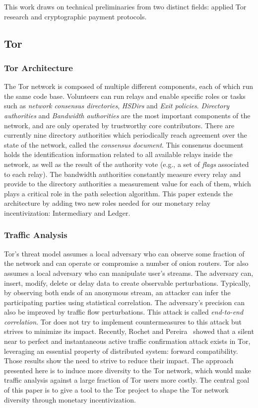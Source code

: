 This work draws on technical preliminaries from two distinct fields: applied
Tor research and cryptographic payment protocols.

\subsection{Tor}

\subsubsection{Tor Architecture}
The Tor network is composed of multiple different components, each of which run
the same code base. Volunteers can run relays and enable specific roles or tasks
such as \textit{network consensus directories}, \textit{HSDirs} and \textit{Exit
  policies}. \textit{Directory authorities} and \textit{Bandwidth authorities}
are the most important components of the network, and are only operated by
trustworthy core contributors. There are currently nine directory authorities
which periodically reach agreement over the state of the network, called the
\textit{consensus document}. This consensus document holds the identification
information related to all available relays inside the network, as well as the
result of the authority vote (e.g., a set of \textit{flags} associated to each
relay). The bandwidth authorities constantly measure every relay and provide to
the directory authorities a measurement value for each of them, which plays a
critical role in the path selection algorithm. This paper extends the
architecture by adding two new roles needed for our monetary relay
incentivization: Intermediary and Ledger.

\subsubsection{Traffic Analysis}
Tor's threat model assumes a local adversary who can observe some fraction of
the network and can operate or compromise a number of onion routers. Tor also
assumes a local adversary who can manipulate user's streams. The adversary can,
insert, modify, delete or delay data to create observable
perturbations. Typically, by observing both ends of an anonymous stream, an
attacker can infer the participating parties using statistical correlation. The
adversary's precision can also be improved by traffic flow perturbations. This
attack is called \textit{end-to-end correlation}. Tor does not try to implement
countermeasures to this attack but strives to minimize its impact. Recently,
Rochet and Pereira~\cite{rochet2018dropping} showed that a silent near to perfect
and instantaneous active traffic confirmation attack exists in Tor, leveraging
an essential property of distributed system: forward compatibility. Those
results show the need to strive to reduce their impact. The approach presented
here is to induce more diversity to the Tor network, which would make traffic
analysis against a large fraction of Tor users more costly. The central goal of
this paper is to give a tool to the Tor project to shape the Tor network
diversity through monetary incentivization.

